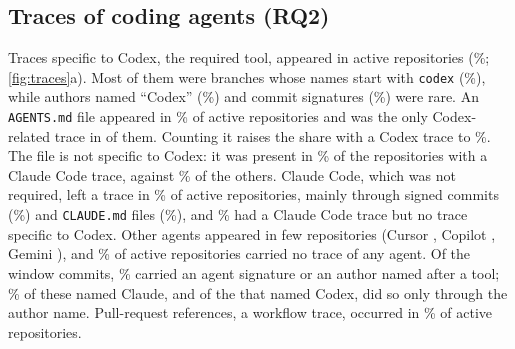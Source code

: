 \documentclass{article}
\begin{document}
\subsection{Traces of coding agents (RQ2)}\label{sec:traces}

Traces specific to Codex, the required tool, appeared in \NRqTwoTracesCodexSpecificN{} active repositories (\NRqTwoTracesCodexSpecificPct\%; \cref{fig:traces}a). Most of them were branches whose names start with \texttt{codex} (\NRqTwoTracesCodexBranchPct\%), while authors named ``Codex'' (\NRqTwoTracesCodexNamePct\%) and commit signatures (\NRqTwoTracesCodexSignaturePct\%) were rare. An \texttt{AGENTS.md} file appeared in \NRqTwoTracesCodexFilePct\% of active repositories and was the only Codex-related trace in \NRqTwoTracesCodexFileOnlyN{} of them. Counting it raises the share with a Codex trace to \NRqTwoTracesCodexAnyPct\%. The file is not specific to Codex: it was present in \NRqTwoTracesAgentsMdWithClaudePct\% of the repositories with a Claude Code trace, against \NRqTwoTracesAgentsMdWithoutClaudePct\% of the others. Claude Code, which was not required, left a trace in \NRqTwoTracesClaudeAnyPct\% of active repositories, mainly through signed commits (\NRqTwoTracesClaudeSignaturePct\%) and \texttt{CLAUDE.md} files (\NRqTwoTracesClaudeFilePct\%), and \NRqTwoTracesClaudeNotCodexSpecificPct\% had a Claude Code trace but no trace specific to Codex. Other agents appeared in few repositories (Cursor \NRqTwoTracesCursorAnyN, Copilot \NRqTwoTracesCopilotAnyN, Gemini \NRqTwoTracesGeminiAnyN), and \NRqTwoTracesNoTracePct\% of active repositories carried no trace of any agent. Of the window commits, \NRqTwoTracesSignedCommitsPct\% carried an agent signature or an author named after a tool; \NRqTwoTracesSignedCommitsClaudeShare\% of these named Claude, and of the \NRqTwoTracesSignedCommitsByKindCodex{} that named Codex, \NRqTwoTracesSignedCommitsCodexNamedOnly{} did so only through the author name. Pull-request references, a workflow trace, occurred in \NRqTwoTracesPrRefsPct\% of active repositories.
\end{document}
